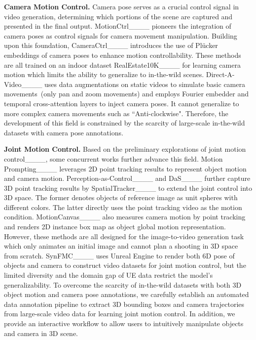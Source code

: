 \noindent\textbf{Camera Motion Control.} Camera pose serves as a crucial control signal in video generation, determining which portions of the scene are captured and presented in the final output. MotionCtrl____ pioneers the integration of camera poses as control signals for camera movement manipulation. Building upon this foundation, CameraCtrl____ introduces the use of Plücker embeddings of camera poses to enhance motion controllability. These methods are all trained on an indoor dataset RealEstate10K____ for learning camera motion which limits the ability to generalize to in-the-wild scenes. Direct-A-Video____ uses data augmentations on static videos to simulate basic camera movements~(only pan and zoom movements) and employs Fourier embedder and temporal cross-attention layers to inject camera poses. It cannot generalize to more complex camera movements such as ``Anti-clockwise". Therefore, the development of this field is constrained by the scarcity of large-scale in-the-wild datasets with camera pose annotations.



\noindent\textbf{Joint Motion Control.} Based on the preliminary explorations of joint motion control____, some concurrent works further advance this field. Motion Prompting____ leverages 2D point tracking results to represent object motion and camera motion. Perception-as-Control____ and DaS____ further capture 3D point tracking results by SpatialTracker____ to extend the joint control into 3D space. The former denotes objects of reference image as unit spheres with different colors. The latter directly uses the point tracking video as the motion condition. MotionCanvas____
also measures camera motion by point tracking and renders 2D instance box map as object global motion representation. However, these methods are all designed for the image-to-video generation task which only animates an initial image and cannot plan a shooting in 3D space from scratch. SynFMC____ uses Unreal Engine to render both 6D pose of objects and camera to construct video datasets for joint motion control, but the limited diversity and the domain gap of UE data restrict the model's generalizability. To overcome the scarcity of in-the-wild datasets with both 3D object motion and camera pose annotations, we carefully establish an automated data annotation pipeline to extract 3D bounding boxes and camera trajectories from large-scale video data for learning joint motion control. In addition, we provide an interactive workflow to allow users to intuitively manipulate objects and camera in 3D scene.